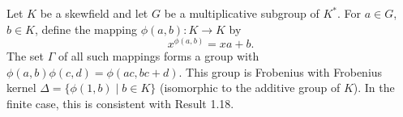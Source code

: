 Let $K$ be a skewfield and let $G$ be a multiplicative subgroup of $K^*$. For $a \in G$, $b \in K$, define the mapping $\phi(a,b) : K \to K$ by
$$x^{\phi(a,b)} = xa + b.$$
The set $\Gamma$ of all such mappings forms a group with $\phi(a,b)\phi(c,d) = \phi(ac, bc + d)$. This group is Frobenius with Frobenius kernel $\Delta = \{\phi(1,b) \mid b \in K\}$ (isomorphic to the additive group of $K$). In the finite case, this is consistent with Result 1.18.
